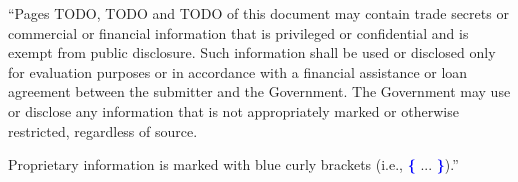 \documentclass[12pt,portrait]{article} %
\date{}
\begin{document}
\maketitle


``Pages TODO, TODO and TODO of this document may contain trade secrets or commercial 
or financial information that is privileged or confidential and is exempt from 
public disclosure. Such information shall be used or disclosed only for 
evaluation purposes or in accordance with a financial assistance or loan 
agreement between the submitter and the Government. The Government may use or 
disclose any information that is not appropriately marked or otherwise 
restricted, regardless of source. 

Proprietary information is marked with blue 
curly brackets (i.e., \textcolor{blue}{\textbf{\{}} ... 
\textcolor{blue}{\textbf{\}}}).''

\newpage


\end{document}
